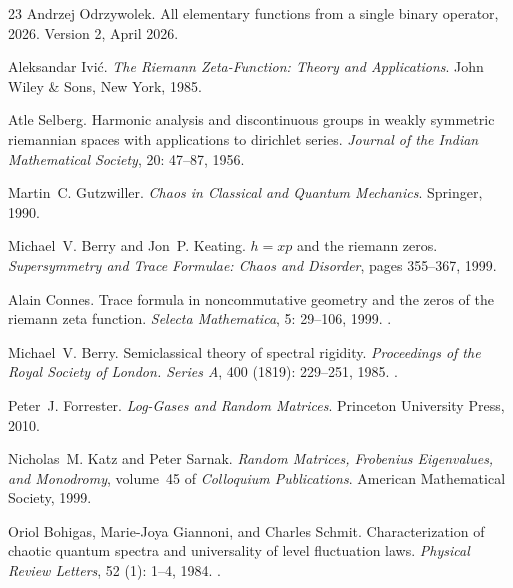 \documentclass[11pt]{article}
\theoremstyle{definition}
\theoremstyle{plain}
\begin{document}
\begin{thebibliography}{23}
Andrzej Odrzywolek.
\newblock All elementary functions from a single binary operator, 2026.
\newblock Version 2, April 2026.

Aleksandar Ivi\'{c}.
\newblock \emph{The Riemann Zeta-Function: Theory and Applications}.
\newblock John Wiley \& Sons, New York, 1985.

Atle Selberg.
\newblock Harmonic analysis and discontinuous groups in weakly symmetric
  riemannian spaces with applications to dirichlet series.
\newblock \emph{Journal of the Indian Mathematical Society}, 20:
  47--87, 1956.

Martin~C. Gutzwiller.
\newblock \emph{Chaos in Classical and Quantum Mechanics}.
\newblock Springer, 1990.

Michael~V. Berry and Jon~P. Keating.
\newblock $h=xp$ and the riemann zeros.
\newblock \emph{Supersymmetry and Trace Formulae: Chaos and Disorder}, pages
  355--367, 1999.

Alain Connes.
\newblock Trace formula in noncommutative geometry and the zeros of the riemann
  zeta function.
\newblock \emph{Selecta Mathematica}, 5: 29--106, 1999.
\newblock {}.

Michael~V. Berry.
\newblock Semiclassical theory of spectral rigidity.
\newblock \emph{Proceedings of the Royal Society of London. Series A},
  400 (1819): 229--251, 1985.
\newblock {}.

Peter~J. Forrester.
\newblock \emph{Log-Gases and Random Matrices}.
\newblock Princeton University Press, 2010.

Nicholas~M. Katz and Peter Sarnak.
\newblock \emph{Random Matrices, Frobenius Eigenvalues, and Monodromy},
  volume~45 of \emph{Colloquium Publications}.
\newblock American Mathematical Society, 1999.

Oriol Bohigas, Marie-Joya Giannoni, and Charles Schmit.
\newblock Characterization of chaotic quantum spectra and universality of level
  fluctuation laws.
\newblock \emph{Physical Review Letters}, 52 (1): 1--4, 1984.
\newblock {}.


\end{thebibliography}
\end{document}
